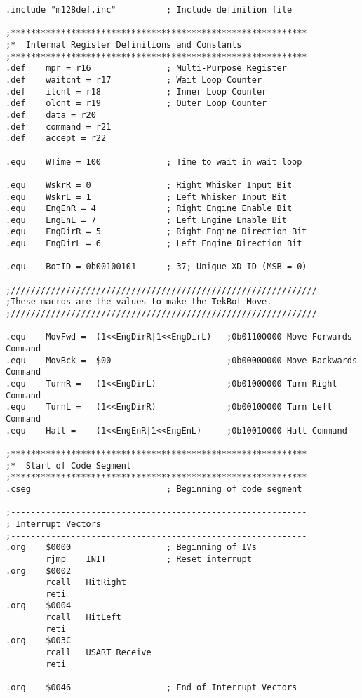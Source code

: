 \documentclass[12pt,letterpaper]{article}
\begin{document}
\begin{verbatim}
.include "m128def.inc"          ; Include definition file

;***********************************************************
;*  Internal Register Definitions and Constants
;***********************************************************
.def    mpr = r16               ; Multi-Purpose Register
.def    waitcnt = r17           ; Wait Loop Counter
.def    ilcnt = r18             ; Inner Loop Counter
.def    olcnt = r19             ; Outer Loop Counter
.def    data = r20
.def    command = r21
.def    accept = r22

.equ    WTime = 100             ; Time to wait in wait loop

.equ    WskrR = 0               ; Right Whisker Input Bit
.equ    WskrL = 1               ; Left Whisker Input Bit
.equ    EngEnR = 4              ; Right Engine Enable Bit
.equ    EngEnL = 7              ; Left Engine Enable Bit
.equ    EngDirR = 5             ; Right Engine Direction Bit
.equ    EngDirL = 6             ; Left Engine Direction Bit

.equ    BotID = 0b00100101      ; 37; Unique XD ID (MSB = 0)

;/////////////////////////////////////////////////////////////
;These macros are the values to make the TekBot Move.
;/////////////////////////////////////////////////////////////

.equ    MovFwd =  (1<<EngDirR|1<<EngDirL)   ;0b01100000 Move Forwards Command
.equ    MovBck =  $00                       ;0b00000000 Move Backwards Command
.equ    TurnR =   (1<<EngDirL)              ;0b01000000 Turn Right Command
.equ    TurnL =   (1<<EngDirR)              ;0b00100000 Turn Left Command
.equ    Halt =    (1<<EngEnR|1<<EngEnL)     ;0b10010000 Halt Command

;***********************************************************
;*  Start of Code Segment
;***********************************************************
.cseg                           ; Beginning of code segment

;-----------------------------------------------------------
; Interrupt Vectors
;-----------------------------------------------------------
.org    $0000                   ; Beginning of IVs
        rjmp    INIT            ; Reset interrupt
.org    $0002
        rcall   HitRight
        reti
.org    $0004
        rcall   HitLeft
        reti
.org    $003C
        rcall   USART_Receive
        reti

.org    $0046                   ; End of Interrupt Vectors


\end{verbatim}
\end{document}
